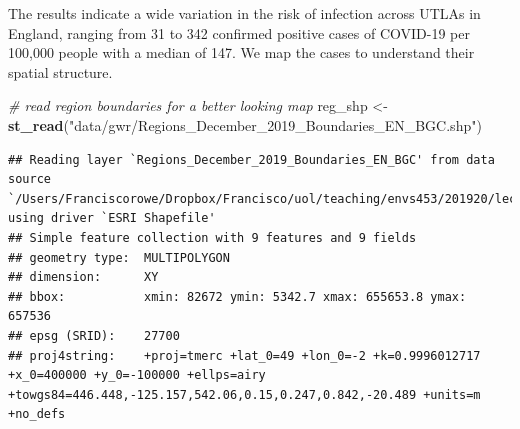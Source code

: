 \documentclass[]{book}
\newenvironment{Shaded}{\begin{snugshade}}{\end{snugshade}}
\newcommand{\KeywordTok}[1]{\textcolor[rgb]{0.13,0.29,0.53}{\textbf{#1}}}
\newcommand{\StringTok}[1]{\textcolor[rgb]{0.31,0.60,0.02}{#1}}
\newcommand{\CommentTok}[1]{\textcolor[rgb]{0.56,0.35,0.01}{\textit{#1}}}
\newcommand{\NormalTok}[1]{#1}
\begin{document}
The results indicate a wide variation in the risk of infection across
UTLAs in England, ranging from 31 to 342 confirmed positive cases of
COVID-19 per 100,000 people with a median of 147. We map the cases to
understand their spatial structure.

\begin{Shaded}
\begin{Highlighting}[]
\CommentTok{# read region boundaries for a better looking map}
\NormalTok{reg_shp <-}\StringTok{ }\KeywordTok{st_read}\NormalTok{(}\StringTok{"data/gwr/Regions_December_2019_Boundaries_EN_BGC.shp"}\NormalTok{)}
\end{Highlighting}
\end{Shaded}

\begin{verbatim}
## Reading layer `Regions_December_2019_Boundaries_EN_BGC' from data source `/Users/Franciscorowe/Dropbox/Francisco/uol/teaching/envs453/201920/lectures/san/data/gwr/Regions_December_2019_Boundaries_EN_BGC.shp' using driver `ESRI Shapefile'
## Simple feature collection with 9 features and 9 fields
## geometry type:  MULTIPOLYGON
## dimension:      XY
## bbox:           xmin: 82672 ymin: 5342.7 xmax: 655653.8 ymax: 657536
## epsg (SRID):    27700
## proj4string:    +proj=tmerc +lat_0=49 +lon_0=-2 +k=0.9996012717 +x_0=400000 +y_0=-100000 +ellps=airy +towgs84=446.448,-125.157,542.06,0.15,0.247,0.842,-20.489 +units=m +no_defs
\end{verbatim}
\end{document}
